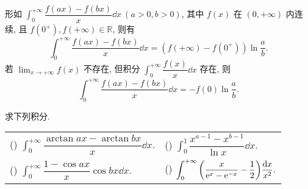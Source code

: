 \begin{theorem}
    形如 $\displaystyle\int_{0}^{+\infty}\dfrac{f(ax)-f(bx)}{x}\dd x~ (a>0,b>0)$, 其中 $f(x)$ 在 $(0,+\infty)$ 内连续, 且 $f(0^+),f(+\infty)\in\mathbb{R} $, 则有
    $$\int_{0}^{+\infty}\dfrac{f(ax)-f(bx)}{x}\dd x=(f(+\infty)-f(0^+))\ln\dfrac{a}{b}.$$
    若 $\displaystyle\lim_{x\to+\infty}f(x)$ 不存在, 但积分 $\displaystyle\int_{0}^{+\infty}\dfrac{f(x)}{x}\dd x$ 存在, 则
    $$\int_{0}^{+\infty}\dfrac{f(ax)-f(bx)}{x}\dd x=-f(0)\ln\dfrac{a}{b}.$$
\end{theorem}

\begin{example}
    求下列积分.
    \setcounter{magicrownumbers}{0}
    \begin{table}[H]
        \centering
        \begin{tabular}{l | l}
            (\rownumber{}) $\displaystyle\int_{0}^{+\infty}\dfrac{\arctan ax-\arctan bx}{x}\dd x.$ & (\rownumber{}) $\displaystyle\int_{0}^{1}\dfrac{x^{a-1}-x^{b-1}}{\ln x}\dd x.$                                                \\
            (\rownumber{}) $\displaystyle\int_{0}^{+\infty}\dfrac{1-\cos ax}{x}\cos bx\dd x.$      & (\rownumber{}) $\displaystyle\int_{0}^{+\infty}\qty(\dfrac{x}{\mathrm{e} ^x-\mathrm{e} ^{-x}}-\dfrac{1}{2})\dfrac{\dd x}{x^2}.$
        \end{tabular}
    \end{table}
\end{example}
